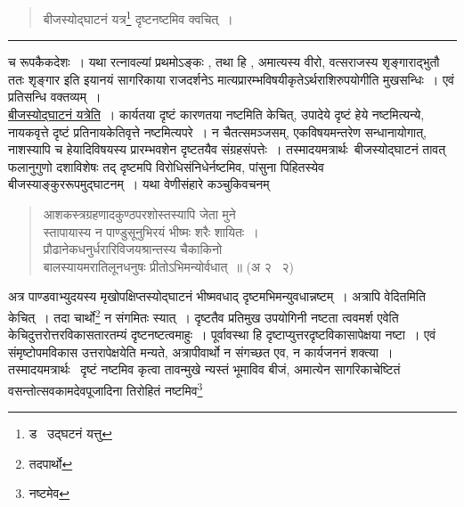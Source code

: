 \documentclass[11pt, openany]{book}
\begin{document}
\newpage

\begin{quote}
{\na बीजस्योद्घाटनं यत्र\renewcommand{\thefootnote}{1}\footnote{ड \textendash\ उद्घटनं यत्तु} दृष्टनष्टमिव क्वचित्~।}
\end{quote}

\hrule

\vspace{2mm}
\noindent
च रूपकैकदेशः~। यथा रत्नावल्यां प्रथमोऽङ्कः , तथा हि , अमात्यस्य वीरो, वत्सराजस्य शृङ्गाराद्भुतौ ततः शृङ्गार इति इयानयं सागरिकाया राजदर्शनेऽ मात्यप्रारम्भविषयीकृतेऽर्थराशिरुपयोगीति मुखसन्धिः~। एवं प्रतिसन्धि वक्तव्यम्~।\\

\underline{बीजस्योद्घाटनं यत्रेति}~। कार्यतया दृष्टं कारणतया नष्टमिति केचित्, उपादेये दृष्टं हेये नष्टमित्यन्ये, नायकवृत्ते दृष्टं प्रतिनायकेतिवृत्ते नष्टमित्यपरे~। न चैतत्समञ्जसम्, एकविषयमन्तरेण सन्धानायोगात्, नाशस्यापि च हेयादिविषयस्य प्रारम्भवशेन दृष्टतयैव संग्रहसंपत्तेः~। तस्मादयमत्रार्थः\textendash\ बीजस्योद्घाटनं तावत् फलानुगुणो दशाविशेषः तद् दृष्टमपि विरोधिसंनिधेर्नष्टमिव, पांसुना पिहितस्येव बीजस्याङ्कुररूपमुद्घाटनम्~। यथा वेणीसंहारे कञ्चुकिवचनम् \textendash

\begin{quote}
{\qt आशकस्त्रग्रहणादकुण्ठपरशोस्तस्यापि जेता मुने\textendash \\
स्तापायास्य न पाण्डुसूनुभिरयं भीष्मः शरैः शायितः~।\\
प्रौढानेकधनुर्धरारिविजयश्रान्तस्य चैकाकिनो\\
बालस्यायमरातिलूनधनुषः प्रीतोऽभिमन्योर्वधात्~॥} (अ २ \textendash\ २)
\end{quote}

\noindent
अत्र पाण्डवाभ्युदयस्य मृखोपक्षिप्तस्योद्घाटनं भीष्मवधाद् दृष्टमभिमन्युवधान्नष्टम्~। अत्रापि वेदितमिति केचित्~। तदा चार्थो\renewcommand{\thefootnote}{1}\footnote{तदपार्थो} न संगमितः स्यात्~। दृष्टतैव प्रतिमुख उपयोगिनी नष्टता त्ववमर्श एवेति केचिदुत्तरोत्तरविकासतारतम्यं दृष्टनष्टत्वमाहुः~। पूर्वावस्था हि दृष्टाप्युत्तरदृष्टविकासापेक्षया नष्टा~। एवं संमृष्टोपमविकास उत्तरापेक्षयेति मन्यते, अत्रापीवार्थो न संगच्छत एव, न कार्यजननं शक्त्या~।\\

तस्मादयमत्रार्थः \textendash\ दृष्टं नष्टमिव कृत्वा तावन्मुखे न्यस्तं भूमाविव बीजं, अमात्येन सागरिकाचेष्टितं वसन्तोत्सवकामदेवपूजादिना तिरोहितं नष्टमिव\renewcommand{\thefootnote}{2}\footnote{नष्टमेव}

\newpage
\end{document}
